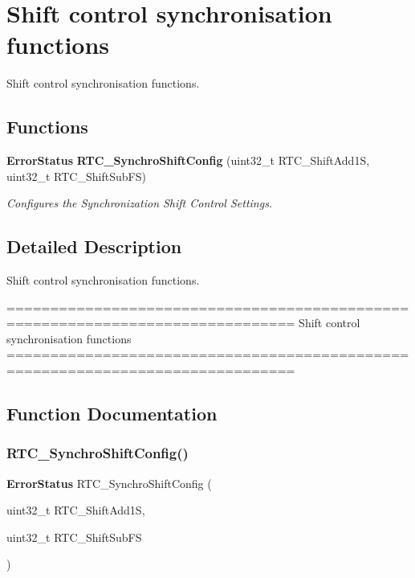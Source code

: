 \section{Shift control synchronisation functions}
\label{group__RTC__Group12}


Shift control synchronisation functions.  


\subsection*{Functions}
\begin{DoxyCompactItemize}
\item 
\textbf{ Error\+Status} \textbf{ R\+T\+C\+\_\+\+Synchro\+Shift\+Config} (uint32\+\_\+t R\+T\+C\+\_\+\+Shift\+Add1S, uint32\+\_\+t R\+T\+C\+\_\+\+Shift\+Sub\+FS)
\begin{DoxyCompactList}\small\item\em Configures the Synchronization Shift Control Settings. \end{DoxyCompactList}\end{DoxyCompactItemize}


\subsection{Detailed Description}
Shift control synchronisation functions. 

\begin{DoxyVerb} ===============================================================================
                   Shift control synchronisation functions
 ===============================================================================  \end{DoxyVerb}
 

\subsection{Function Documentation}
\mbox{\label{group__RTC__Group12_gaad434ed2a268f05662f0613e8e9717f3}} 
\subsubsection{R\+T\+C\+\_\+\+Synchro\+Shift\+Config()}
{\footnotesize\ttfamily \textbf{ Error\+Status} R\+T\+C\+\_\+\+Synchro\+Shift\+Config (\begin{DoxyParamCaption}\item[{uint32\+\_\+t}]{R\+T\+C\+\_\+\+Shift\+Add1S,  }\item[{uint32\+\_\+t}]{R\+T\+C\+\_\+\+Shift\+Sub\+FS }\end{DoxyParamCaption})}



